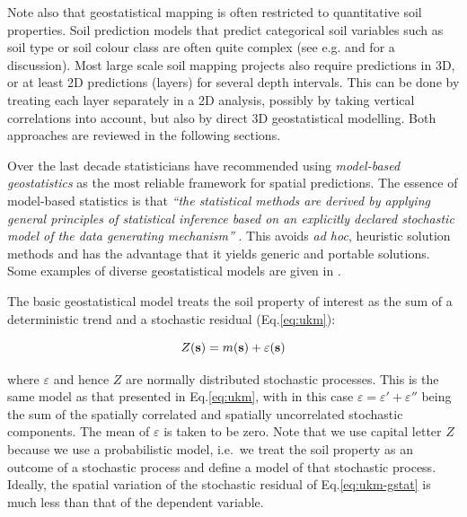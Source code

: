 \documentclass[11pt]{krantz}
\theoremstyle{definition}
\theoremstyle{definition}
\theoremstyle{definition}
\theoremstyle{remark}
\begin{document}
Note also that geostatistical mapping is often restricted to
quantitative soil properties. Soil prediction models that predict
categorical soil variables such as soil type or soil colour class are
often quite complex (see e.g. \citet{Hengl2007Geoderma} and
\citet{Kempen2009Geoderma} for a discussion). Most large scale soil
mapping projects also require predictions in 3D, or at least 2D
predictions (layers) for several depth intervals. This can be done by
treating each layer separately in a 2D analysis, possibly by taking
vertical correlations into account, but also by direct 3D geostatistical
modelling. Both approaches are reviewed in the following sections.

Over the last decade statisticians have recommended using
\emph{model-based geostatistics} as the most reliable framework for
spatial predictions. The essence of model-based statistics is that
\emph{``the statistical methods are derived by applying general
principles of statistical inference based on an explicitly declared
stochastic model of the data generating mechanism''}
\citep{Diggle2007Springer, Brown2014JSS}. This avoids \emph{ad hoc},
heuristic solution methods and has the advantage that it yields generic
and portable solutions. Some examples of diverse geostatistical models
are given in \citet{Brown2014JSS}.

The basic geostatistical model treats the soil property of interest as
the sum of a deterministic trend and a stochastic residual
(Eq.\eqref{eq:ukm}):

\begin{equation}
Z({\bf{s}}) = m({\bf{s}}) + \varepsilon({\bf{s}})
\label{eq:ukm-gstat}
\end{equation}

where \(\varepsilon\) and hence \(Z\) are normally distributed
stochastic processes. This is the same model as that presented in
Eq.\eqref{eq:ukm}, with in this case
\(\varepsilon = \varepsilon ' + \varepsilon ''\) being the sum of the
spatially correlated and spatially uncorrelated stochastic components.
The mean of \(\varepsilon\) is taken to be zero. Note that we use
capital letter \(Z\) because we use a probabilistic model, i.e.~we treat
the soil property as an outcome of a stochastic process and define a
model of that stochastic process. Ideally, the spatial variation of the
stochastic residual of Eq.\eqref{eq:ukm-gstat} is much less than that of
the dependent variable.
\end{document}
